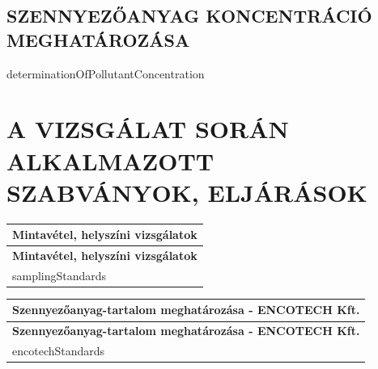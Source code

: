 \documentclass[a4paper,12pt]{article}
\renewcommand{\arraystretch}{0.5}
\begin{document}
	\subsection{SZENNYEZŐANYAG KONCENTRÁCIÓ MEGHATÁROZÁSA}
	
	\begin{adjustwidth}{1cm}{0cm}

		\vspace{1.0em} %

		{{determinationOfPollutantConcentration}}

		\vspace{1.0em}

	\end{adjustwidth}
	
	
	\newpage
	\section{A VIZSGÁLAT SORÁN ALKALMAZOTT SZABVÁNYOK, ELJÁRÁSOK}
	
		\renewcommand{\arraystretch}{1.1} %
		\footnotesize %

		\begin{longtable}{|p{5cm}|p{10cm}|}
			\hline
			\multicolumn{2}{|c|}{\textbf{Mintavétel, helyszíni vizsgálatok}} \\
			\hline
			\endfirsthead

			\multicolumn{2}{|c|}{\textbf{Mintavétel, helyszíni vizsgálatok}} \\
			\hline
			\endhead

			\endfoot

			\hline
			\endlastfoot

			{{samplingStandards}}

		\end{longtable}

		\begin{longtable}{|p{5cm}|p{10cm}|}
			\hline
			\multicolumn{2}{|c|}{\textbf{Szennyezőanyag-tartalom meghatározása - ENCOTECH Kft.}} \\
			\hline
			\endfirsthead

			\hline
			\multicolumn{2}{|c|}{\textbf{Szennyezőanyag-tartalom meghatározása - ENCOTECH Kft.}} \\
			\hline
			\endhead

			\endfoot

			\hline
			\endlastfoot

			{{encotechStandards}}

		\end{longtable}
\end{document}
